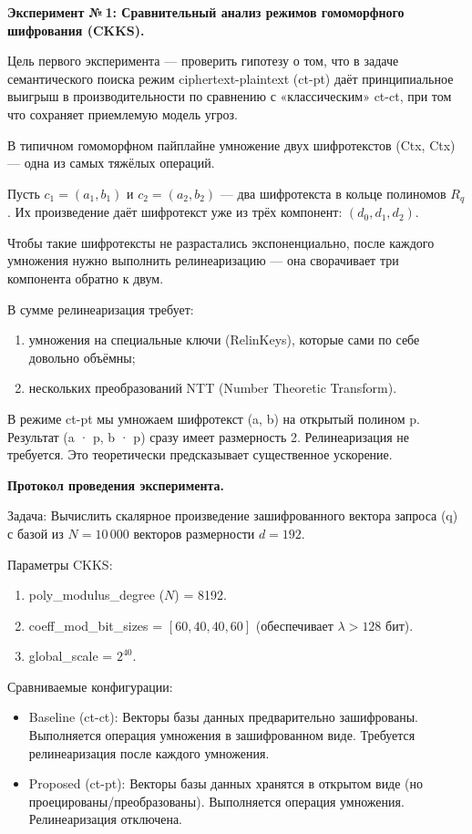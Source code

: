 \documentclass[a4paper, 12pt, oneside, openany]{article}
\begin{document}
\textbf{Эксперимент №\,1: Сравнительный анализ режимов гомоморфного шифрования (CKKS).}

Цель первого эксперимента — проверить гипотезу о том, что в задаче семантического поиска режим ciphertext-plaintext (ct-pt) даёт принципиальное выигрыш в производительности по сравнению с «классическим» ct-ct, при том что сохраняет приемлемую модель угроз.

В типичном гомоморфном пайплайне умножение двух шифротекстов (Ctx, Ctx) — одна из самых тяжёлых операций.

Пусть $c_1 = (a_1, b_1)$ и $c_2 = (a_2, b_2)$ — два шифротекста в кольце полиномов $R_q$. Их произведение даёт шифротекст уже из трёх компонент: $(d_0, d_1, d_2)$.

Чтобы такие шифротексты не разрастались экспоненциально, после каждого умножения нужно выполнить релинеаризацию — она сворачивает три компонента обратно к двум.

В сумме релинеаризация требует:
\begin{enumerate}
	\def\labelenumi{\arabic{enumi}.}
	\item
	умножения на специальные ключи (RelinKeys), которые сами по себе довольно объёмны;
	\item
	нескольких преобразований NTT (Number Theoretic Transform).
\end{enumerate}

В режиме ct-pt мы умножаем шифротекст (a, b) на открытый полином p. Результат (a · p, b · p) сразу имеет размерность 2. Релинеаризация не требуется. Это теоретически предсказывает существенное ускорение.

\textbf{Протокол проведения эксперимента.}

Задача: Вычислить скалярное произведение зашифрованного вектора запроса (q) с базой из $N = 10\,000$ векторов размерности $d = 192$.

Параметры CKKS:
\begin{enumerate}
	\def\labelenumi{\arabic{enumi}.}
	\item
	poly\_modulus\_degree ($N$) = 8192.
	\item
	coeff\_mod\_bit\_sizes = $[60, 40, 40, 60]$ (обеспечивает $\lambda > 128$ бит).
	\item
	global\_scale = $2^{40}$.
\end{enumerate}

Сравниваемые конфигурации:
\begin{itemize}
	\item
	Baseline (ct-ct): Векторы базы данных предварительно зашифрованы. Выполняется операция умножения в зашифрованном виде. Требуется релинеаризация после каждого умножения.
	\item
	Proposed (ct-pt): Векторы базы данных хранятся в открытом виде (но проецированы/преобразованы). Выполняется операция умножения. Релинеаризация отключена.
\end{itemize}
\end{document}

